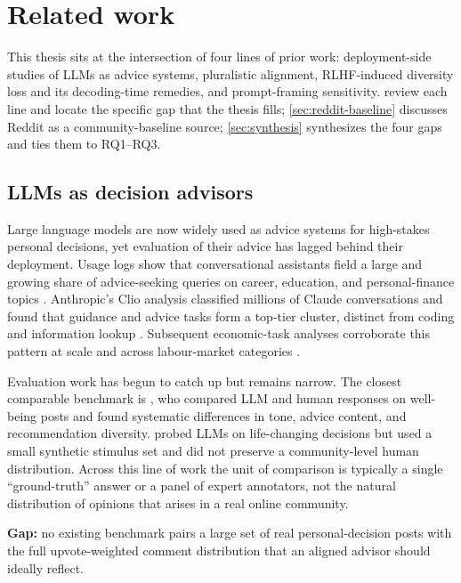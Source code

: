 \chapter{Related work}
\label{chap:related_work}

This thesis sits at the intersection of four lines of prior work:
deployment-side studies of LLMs as advice systems, pluralistic
alignment, RLHF-induced diversity loss and its decoding-time
remedies, and prompt-framing sensitivity.
 review each
line and locate the specific gap that the thesis fills;
\cref{sec:reddit-baseline} discusses Reddit as a community-baseline
source; \cref{sec:synthesis}
synthesizes the four gaps and ties them to RQ1--RQ3.

\section{LLMs as decision advisors}
\label{sec:advisors}

Large language models are now widely used as advice systems for
high-stakes personal decisions, yet evaluation of their advice has
lagged behind their deployment. Usage logs show that conversational
assistants field a large and growing share of advice-seeking queries
on career, education, and personal-finance topics
\citep{chatterji-2025-chatgpt, tamkin-2024-clio}. Anthropic's Clio
analysis classified millions of Claude conversations and found that
guidance and advice tasks form a top-tier cluster, distinct from
coding and information lookup \citep{tamkin-2024-clio}. Subsequent
economic-task analyses corroborate this pattern at scale and across
labour-market categories \citep{handa-2025-economic-tasks}.

Evaluation work has begun to catch up but remains narrow. The closest
comparable benchmark is \citet{kumar-2026-when-ai-gives}, who
compared LLM and human responses on well-being posts and found
systematic differences in tone, advice content, and recommendation
diversity. \citet{cahyono-2025-life-changing} probed LLMs on
life-changing decisions but used a small synthetic stimulus set and
did not preserve a community-level human distribution. Across this
line of work the unit of comparison is typically a single
``ground-truth'' answer or a panel of expert annotators, not the
natural distribution of opinions that arises in a real online
community.

\textbf{Gap:} no existing benchmark pairs a large set of real
personal-decision posts with the full upvote-weighted comment
distribution that an aligned advisor should ideally reflect.

